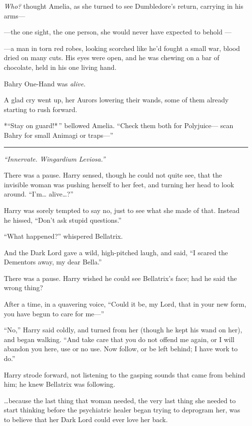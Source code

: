 \emph{Who?} thought Amelia, as she turned to see Dumbledore's return,
carrying in his arms---

---the one sight, the one person, she would never have expected to
behold ---

---a man in torn red robes, looking scorched like he'd fought a small
war, blood dried on many cuts. His eyes were open, and he was chewing on
a bar of chocolate, held in his one living hand.

Bahry One-Hand was \emph{alive.}

A glad cry went up, her Aurors lowering their wands, some of them
already starting to rush forward.

*``Stay on guard!* '' bellowed Amelia. ``Check them both for
Polyjuice--- scan Bahry for small Animagi or traps---''

\begin{center}\rule{3in}{0.4pt}\end{center}

\emph{``Innervate. Wingardium Leviosa.''}

There was a pause. Harry sensed, though he could not quite see, that the
invisible woman was pushing herself to her feet, and turning her head to
look around. ``I'm\ldots{} alive\ldots{}?''

Harry was sorely tempted to say no, just to see what she made of that.
Instead he hissed, ``Don't ask stupid questions.''

``What happened?'' whispered Bellatrix.

And the Dark Lord gave a wild, high-pitched laugh, and said, ``I scared
the Dementors away, my dear Bella.''

There was a pause. Harry wished he could see Bellatrix's face; had he
said the wrong thing?

After a time, in a quavering voice, ``Could it be, my Lord, that in your
new form, you have begun to care for me---''

``No,'' Harry said coldly, and turned from her (though he kept his wand
on her), and began walking. ``And take care that you do not offend me
again, or I will abandon you here, use or no use. Now follow, or be left
behind; I have work to do.''

Harry strode forward, not listening to the gasping sounds that came from
behind him; he knew Bellatrix was following.

\ldots{}because the last thing that woman needed, the very last thing
she needed to start thinking before the psychiatric healer began trying
to deprogram her, was to believe that her Dark Lord could ever love her
back.

